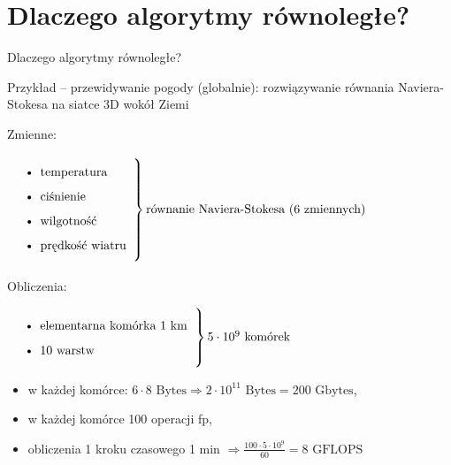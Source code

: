 \section{Dlaczego algorytmy równoległe?}

\begin{frame}{Dlaczego algorytmy równoległe?}

\begin{exampleblock}{Przykład -- przewidywanie pogody (globalnie):}
rozwiązywanie równania Naviera-Stokesa na siatce 3D wokół Ziemi

Zmienne:

  $\left. \parbox{10em}
{\begin{itemize}
   \item \text{temperatura}
   \item \text{ciśnienie}
   \item \text{wilgotność}
   \item \text{prędkość wiatru}
  \end{itemize}}
\right \} \text{równanie Naviera-Stokesa (6 zmiennych)}$
\end{exampleblock}

Obliczenia:

$\left. \parbox{15em}
{\begin{itemize}
   \item \text{elementarna komórka 1 km}
   \item \text{10 warstw}
  \end{itemize}}
\right \} 5\cdot10^9\text{ komórek}$

\begin{itemize}
    \item w każdej komórce:
	$6\cdot 8 \text{ Bytes} \Rightarrow 2\cdot 10^{11} \text{ Bytes} = 200 \text{ Gbytes}$,

    \item w każdej komórce 100 operacji fp,
    \item obliczenia 1 kroku czasowego 1 min $\Rightarrow \frac{100\cdot5\cdot10^9}{60} = 8 \text{ GFLOPS}$
 \end{itemize}

\end{frame}
